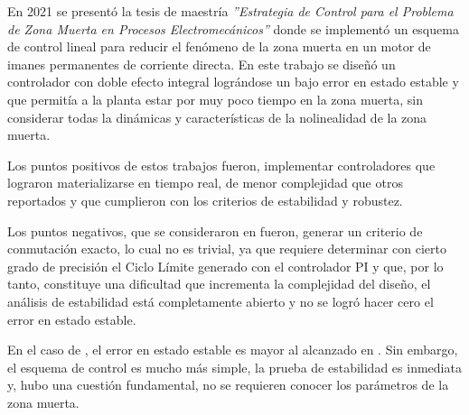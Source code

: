 En 2021 se presentó la tesis de maestría \emph{''Estrategia de Control para el Problema de Zona Muerta en Procesos Electromecánicos''} \cite{perez} donde se implementó un esquema de control lineal para reducir el fenómeno de la zona muerta en un motor de imanes permanentes de corriente directa. En este trabajo se diseñó un controlador con doble efecto integral lográndose un bajo error en estado estable y que permitía a la planta estar por muy poco tiempo en la zona muerta, sin considerar todas la dinámicas y características de la nolinealidad de la zona muerta.

Los puntos positivos de estos trabajos fueron, implementar controladores que lograron materializarse en tiempo real, de menor complejidad que otros reportados y que cumplieron con los criterios de estabilidad y robustez.

Los puntos negativos, que se consideraron en \cite{alcantara} fueron, generar un criterio de conmutación exacto, lo cual no es trivial, ya que requiere determinar con cierto grado de precisión el Ciclo Límite generado con el controlador PI y que, por lo tanto, constituye una dificultad que incrementa la complejidad del diseño,  el análisis  de estabilidad está completamente abierto y no se logró hacer cero el error en estado estable.

En el caso de \cite{perez}, el  error en estado estable es mayor al alcanzado en \cite{alcantara}. Sin embargo, el esquema de control es mucho más simple, la prueba de estabilidad es inmediata y, hubo una cuestión fundamental, no se requieren conocer los parámetros de la zona muerta.

